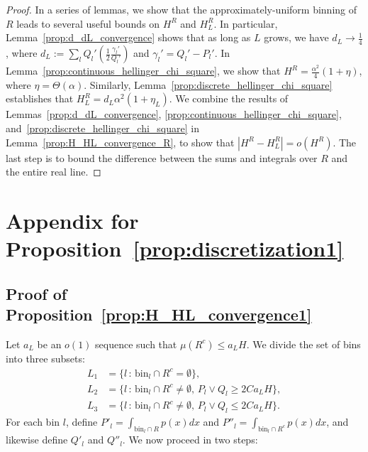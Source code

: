 \documentclass{article}
\newcommand{\bin}{\text{bin}}
\begin{document}
\begin{proof}
In a series of lemmas, we show that the approximately-uniform binning of $R$ leads to several useful bounds on $H^R$ and $H^R_L$. In particular, Lemma~\ref{prop:d_dL_convergence} shows that as long as $L$ grows, we have $d_L \to \frac{1}{4}$, where $d_L := \sum_l Q_l' \left(\frac{1}{2} \frac{\gamma_l'}{Q_l'}\right)$
and $\gamma_l' = Q_l'-P_l'$.
In Lemma~\ref{prop:continuous_hellinger_chi_square}, we show that 
$H^R = \frac{\alpha^2}{4} (1+\eta)$,
where $\eta = \Theta(\alpha)$. Similarly, Lemma~\ref{prop:discrete_hellinger_chi_square} establishes that $H^R_L = d_L\alpha^2(1+\eta_L)$. We combine the results of Lemmas~\ref{prop:d_dL_convergence}, \ref{prop:continuous_hellinger_chi_square}, and~\ref{prop:discrete_hellinger_chi_square} in Lemma~\ref{prop:H_HL_convergence_R}, to show that $|H^R-H^R_L| = o(H^R)$.
The last step is to bound the difference between the sums and integrals over $R$ and the entire real line.
\end{proof}

\section{Appendix for Proposition~\ref{prop:discretization1}}

\subsection{Proof of Proposition~\ref{prop:H_HL_convergence1}}
\label{appendix: d1}

Let $a_L$ be an $o(1)$ sequence such that $\mu(R^c) \leq a_L H $. We divide the set of bins into three subsets:
\begin{align*}
L_1 &= \{ l\,:\, \bin_l \cap R^c = \emptyset \}, \\
L_2 &= \{ l \,:\, \bin_l \cap R^c \neq \emptyset, \, P_l \vee Q_l \geq 2C a_L H \}, \\
L_3 &= \{ l \,:\, \bin_l \cap R^c \neq \emptyset, \, P_l \vee Q_l \leq 2C a_L H \}.
\end{align*}
For each bin $l$, define $P'_l = \int_{\bin_l \cap R} p(x) dx$ and $P''_l = \int_{\bin_l \cap R^c} p(x) dx$, and likewise define $Q'_l$ and $Q''_l$. We now proceed in two steps:
\end{document}
